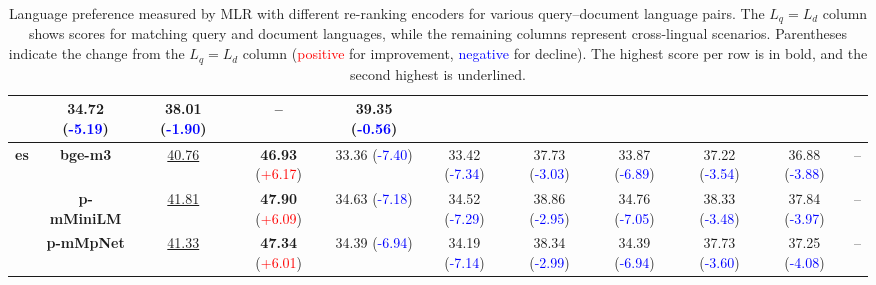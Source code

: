 \begin{table*}[!ht]
{\begin{tabular}{cc|>{\columncolor{gray!15}}c|cccccccc}
  & 34.72 {\scriptsize(\textcolor{blue}{-5.19})}
  & 38.01 {\scriptsize(\textcolor{blue}{-1.90})}
  & -- 
  & 39.35 {\scriptsize(\textcolor{blue}{-0.56})} \\
\midrule
\multirow{3}{*}{\textbf{es}}
& \textbf{bge-m3}
  & \underline{40.76}
  & \textbf{46.93} {\scriptsize(\textcolor{red}{+6.17})}
  & 33.36 {\scriptsize(\textcolor{blue}{-7.40})}
  & 33.42 {\scriptsize(\textcolor{blue}{-7.34})}
  & 37.73 {\scriptsize(\textcolor{blue}{-3.03})}
  & 33.87 {\scriptsize(\textcolor{blue}{-6.89})}
  & 37.22 {\scriptsize(\textcolor{blue}{-3.54})}
  & 36.88 {\scriptsize(\textcolor{blue}{-3.88})}
  & -- \\
& \textbf{p-mMiniLM}
  & \underline{41.81}
  & \textbf{47.90} {\scriptsize(\textcolor{red}{+6.09})}
  & 34.63 {\scriptsize(\textcolor{blue}{-7.18})}
  & 34.52 {\scriptsize(\textcolor{blue}{-7.29})}
  & 38.86 {\scriptsize(\textcolor{blue}{-2.95})}
  & 34.76 {\scriptsize(\textcolor{blue}{-7.05})}
  & 38.33 {\scriptsize(\textcolor{blue}{-3.48})}
  & 37.84 {\scriptsize(\textcolor{blue}{-3.97})}
  & -- \\
& \textbf{p-mMpNet}
  & \underline{41.33}
  & \textbf{47.34} {\scriptsize(\textcolor{red}{+6.01})}
  & 34.39 {\scriptsize(\textcolor{blue}{-6.94})}
  & 34.19 {\scriptsize(\textcolor{blue}{-7.14})}
  & 38.34 {\scriptsize(\textcolor{blue}{-2.99})}
  & 34.39 {\scriptsize(\textcolor{blue}{-6.94})}
  & 37.73 {\scriptsize(\textcolor{blue}{-3.60})}
  & 37.25 {\scriptsize(\textcolor{blue}{-4.08})}
  & -- \\
\bottomrule
\end{tabular}
}
\begin{comment}
\caption{
Language preference measured by MLR with various re-ranking encoders for various query and document language combinations in a multilingual retriever. The \(L_q=L_d\) column reports the diagonal scores where the query language matches the translated document language, while the remaining columns represent cross-lingual scenarios (i.e., where the query language differs from the document language). Scores in parentheses indicate the difference from the diagonal value (\textcolor{red}{positive} for an improvement, \textcolor{blue}{negative} for a decline). The highest score for each row is highlighted in bold, and the second highest is underlined.
}
\end{comment}
\caption{Language preference measured by MLR with different re-ranking encoders for various query–document language pairs. The \(L_q=L_d\) column shows scores for matching query and document languages, while the remaining columns represent cross-lingual scenarios. Parentheses indicate the change from the \(L_q=L_d\) column (\textcolor{red}{positive} for improvement, \textcolor{blue}{negative} for decline). The highest score per row is in bold, and the second highest is underlined.}
\label{tab:subset_mlr}
\end{table*}
